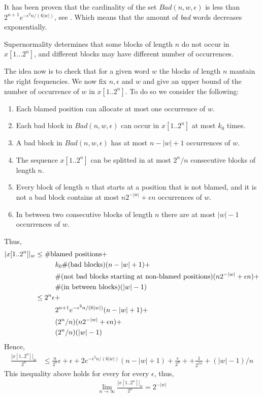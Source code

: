 \documentclass[11pt,a4paper]{tesis}
\begin{document}
It has been proven that the cardinality of the set $Bad(n, w, \epsilon)$ is less than $2^{n+1} e^{-\epsilon^2 n/(6|w|)}$,
see \cite[Lemma 7.3.5]{BC19}. Which means that the amount of \textit{bad} words decreases exponentially.

Supernormality determines that  some blocks of length $n$
do not occur in $x[1\dots  2^n]$, and different blocks may 
have different number of occurrences.

The idea now is to check that for a given word $w$ the blocks of length $n$ mantain the right frequencies.
We now fix $ n, \epsilon$ and $w$ and give an upper bound of  the number of occurrence of $w$ in 
$x[1 .. 2^n]$. To do so we consider the following:
\begin{enumerate}
\item Each blamed position can allocate at most one occurrence of $w$.
\item Each bad block in $Bad(n, w, \epsilon)$ can occur in $x[1.. 2^n]$
 at most $k_0$ times.
\item A bad block in $Bad(n, w, \epsilon)$ has at most $n-|w|+1$ occurrences of $w$.
\item The sequence $x[1..  2^n]$ can be splitted in at most $ 2^n/n$ consecutive blocks
of length $n$.  
\item Every block  of length $n$ that starts at a position that is not blamed,  and it is not a bad block
 contains at most $n 2^{-|w|} + \epsilon n $ occurrences of $w$.
\item In between two consecutive blocks of length $n$ there are at most $|w|-1$ occurrences of $w$.
\end{enumerate}
Thus,
\begin{align*}
|x[1.. 2^n]|_w & \leq 
 \#\text{blamed positions} +
\\& \hspace*{1cm}k_0 \#(\text{bad blocks}) (n-|w|+1)+
\\& \hspace*{1cm}\#(\text{not bad blocks starting at non-blamed positions}) (n 2^{-|w|} + \epsilon n)+
\\& \hspace*{1cm} \#(\text{in between blocks})  (|w|-1)
\\
&\leq 2^n \epsilon + 
\\& \hspace*{1cm}2^{n+1} e^{-\epsilon^2 n/(6|w|)} (n-|w|+1)+
\\& \hspace*{1cm} ( 2^n /n) (n 2^{-|w|} + \epsilon n)+
\\& \hspace*{1cm} ( 2^n/n) (|w|-1)
\end{align*}
Hence, 
\begin{align*}
\frac{|x[1..  2^n]|_w }{ 2^n}&\leq 
 \frac{n}{ 2^{n}} \epsilon+   \epsilon+
2 e^{-\epsilon^2 n/(6|w|)}  (n-|w|+1)+\frac{ \epsilon}{2^{n}}+
+  \frac{1}{2^{|w|}} + (|w|-1)/n
\end{align*}
This  inequality above holds for every  for every $\epsilon$, thus,
\begin{align*}
\lim_{n\to \infty}\frac{|x[1.. 2^n]|_w }{ 2^n}= {2^{-|w|}}
\end{align*}
\end{document}

